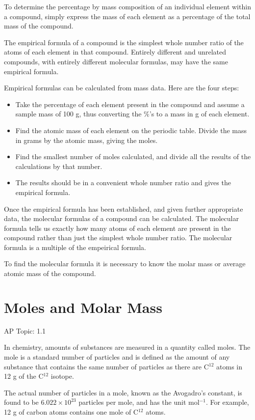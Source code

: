 \documentclass[../chem.tex]{subfiles}
\begin{document}
To determine the percentage by mass composition of an individual element within a compound, simply express the mass of each element as a percentage of the total mass of the compound.

The empirical formula of a compound is the simplest whole number ratio of the atoms of each element in that compound. 
Entirely different and unrelated compounds, with entirely different molecular formulas, may have the same empirical formula.

Empirical formulas can be calculated from mass data. Here are the four steps:
\begin{itemize}
    \item Take the percentage of each element present in the compound and assume a sample mass of 100 g, thus converting the $\%$'s to a mass in g of each element.
    \item Find the atomic mass of each element on the periodic table. Divide the mass in grams by the atomic mass, giving the moles.
    \item Find the smallest number of moles calculated, and divide all the results of the calculations by that number.
    \item The results should be in a convenient whole number ratio and gives the empirical formula.
\end{itemize}

Once the empirical formula has been established, and given further appropriate data, the molecular formulas of a compound can be calculated.
The molecular formula tells us exactly how many atoms of each element are present in the compound rather than just the simplest whole number ratio.
The molecular formula is a multiple of the empeirical formula.

To find the molecular formula it is necessary to know the molar mass or average atomic mass of the compound. 
\section{Moles and Molar Mass}
AP Topic: 1.1

In chemistry, amounts of substances are measured in a quantity called moles. The mole is a standard number of particles and is defined as the 
amount of any substance that contains the same number of particles as there are C$^{12}$ atoms in 12 g of the C$^{12}$ isotope.

The actual number of particles in a mole, known as the Avogadro's constant, is found to be $6.022\times10^{23}$ particles per mole, and has the unit mol$^{-1}$. 
For example, 12 g of carbon atoms contains one mole of C$^{12}$ atoms.
\end{document}

